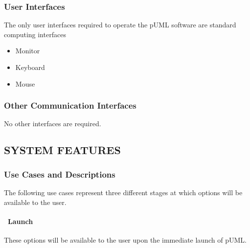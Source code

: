 \documentclass[twoside,letterpaper]{article}
\begin{document}
\subsubsection[User Interfaces]{\rmfamily\bfseries
User Interfaces}
{
The only user interfaces required to operate the pUML software are standard computing interfaces
\begin{itemize}
  \item Monitor
  \item Keyboard
  \item Mouse
\end{itemize}
}

\subsubsection[Other Communication
Interfaces]{\rmfamily\bfseries
Other Communication Interfaces}
{
{No other interfaces are required. }}





\clearpage\setcounter{page}{1}\pagestyle{Convertv}

\subsection[SYSTEM FEATURES]{\rmfamily\bfseries
SYSTEM FEATURES}


\subsubsection{Use Cases and Descriptions}
{The following use cases represent three different stages at which options will be available to the user.}

\bigskip
\bigskip

\paragraph[\ Use Category]
{\ Launch} {These options will be available to the user upon the immediate launch of pUML.}
\end{document}
